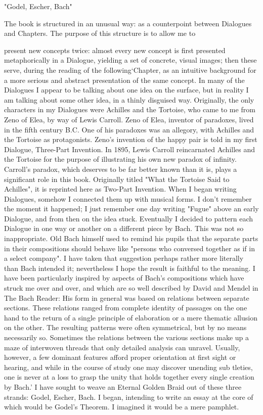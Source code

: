 "Godel, Escher, Bach" 

The book is structured in an unusual way: as a counterpoint between Dialogues and Chapters. The purpose of this structure is to allow me to 







present new concepts twice: almost every new concept is first presented metaphorically in a Dialogue, yielding a set of concrete, visual images; then these serve, during the reading of the following`Chapter, as an intuitive background for a more serious and abstract presentation of the same concept. In many of the Dialogues I appear to be talking about one idea on the surface, but in reality I am talking about some other idea, in a thinly disguised way. Originally, the only characters in my Dialogues were Achilles and the Tortoise, who came to me from Zeno of Elea, by way of Lewis Carroll. Zeno of Elea, inventor of paradoxes, lived in the fifth century B.C. One of his paradoxes was an allegory, with Achilles and the Tortoise as protagonists. Zeno's invention of the happy pair is told in my first Dialogue, Three-Part Invention. In 1895, Lewis Carroll reincarnated Achilles and the Tortoise for the purpose of illustrating his own new paradox of infinity. Carroll's paradox, which deserves to be far better known than it is, plays a significant role in this book. Originally titled "What the Tortoise Said to Achilles", it is reprinted here as Two-Part Invention. When I began writing Dialogues, somehow I connected them up with musical forms. I don't remember the moment it happened; I just remember one day writing "Fugue" above an early Dialogue, and from then on the idea stuck. Eventually I decided to pattern each Dialogue in one way or another on a different piece by Bach. This was not so inappropriate. Old Bach himself used to remind his pupils that the separate parts in their compositions should behave like "persons who conversed together as if in a select company". I have taken that suggestion perhaps rather more literally than Bach intended it; nevertheless I hope the result is faithful to the meaning. I have been particularly inspired by aspects of Bach's compositions which have struck me over and over, and which are so well described by David and Mendel in The Bach Reader: His form in general was based on relations between separate sections. These relations ranged from complete identity of passages on the one hand to the return of a single principle of elaboration or a mere thematic allusion on the other. The resulting patterns were often symmetrical, but by no means necessarily so. Sometimes the relations between the various sections make up a maze of interwoven threads that only detailed analysis can unravel. Usually, however, a few dominant features afford proper orientation at first sight or hearing, and while in the course of study one may discover unending sub tleties, one is never at a loss to grasp the unity that holds together every single creation by Bach.' I have sought to weave an Eternal Golden Braid out of these three strands: Godel, Escher, Bach. I began, intending to write an essay at the core of which would be Godel's Theorem. I imagined it would be a mere pamphlet. 